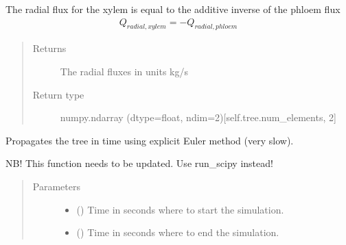 \documentclass[letterpaper,10pt,english]{sphinxmanual}
\begin{document}
\begin{fulllineitems}
\begin{fulllineitems}
The radial flux for the xylem is equal to the additive inverse of the phloem flux
\begin{equation*}
\begin{split}Q_{radial,xylem} = -Q_{radial,phloem}\end{split}
\end{equation*}\begin{quote}\begin{description}
\item[{Returns}] \leavevmode
The radial fluxes in units kg/s

\item[{Return type}] \leavevmode
numpy.ndarray (dtype=float, ndim=2){[}self.tree.num\_elements, 2{]}

\end{description}\end{quote}

\end{fulllineitems}


\begin{fulllineitems}
\label{\detokenize{index:src.model.Model.run}}
Propagates the tree in time using explicit Euler method (very slow).

NB! This function needs to be updated. Use run\_scipy instead!
\begin{quote}\begin{description}
\item[{Parameters}] \leavevmode\begin{itemize}
\item {} 
 () \textendash{} Time in seconds where to start the simulation.

\item {} 
 () \textendash{} Time in seconds where to end the simulation.


\end{itemize}
\end{description}
\end{quote}
\end{fulllineitems}
\end{fulllineitems}
\end{document}

